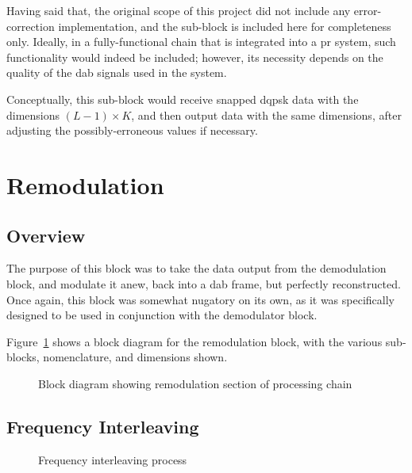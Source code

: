 \documentclass[class=report,11pt,crop=false]{standalone}
\begin{document}
Having said that, the original scope of this project did not include any error-correction implementation, and the sub-block is included here for completeness only. Ideally, in a fully-functional chain that is integrated into a \gls{pr} system, such functionality would indeed be included; however, its necessity depends on the quality of the \gls{dab} signals used in the system.

Conceptually, this sub-block would receive snapped \gls{dqpsk} data with the dimensions \((L-1)\times K\), and then output data with the same dimensions, after adjusting the possibly-erroneous values if necessary.

\section{Remodulation \label{sect:dab-proc_remodulate}}

\subsection{Overview}
The purpose of this block was to take the data output from the demodulation block, and modulate it anew, back into a \gls{dab} frame, but perfectly reconstructed. Once again, this block was somewhat nugatory on its own, as it was specifically designed to be used in conjunction with the demodulator block.

Figure~\ref{fig:BD_Remod_All} shows a block diagram for the remodulation block, with the various sub-blocks, nomenclature, and dimensions shown.

\begin{figure}[htbp]
    \centering
    \captionsetup{type=figure}
    \def\svgwidth{\linewidth}
    { %
        }
    \caption{Block diagram showing remodulation section of processing chain}
    \label{fig:BD_Remod_All}
\end{figure}

\subsection{Frequency Interleaving \label{subsect:dab-proc_freq-interleave}}

\begin{figure}[htbp]
  \centering
  \captionsetup{type=figure}
  \def\svgwidth{\linewidth}
  { %
  }
  \caption{Frequency interleaving process}
  \label{fig:freq_interleave}
\end{figure}
\end{document}
